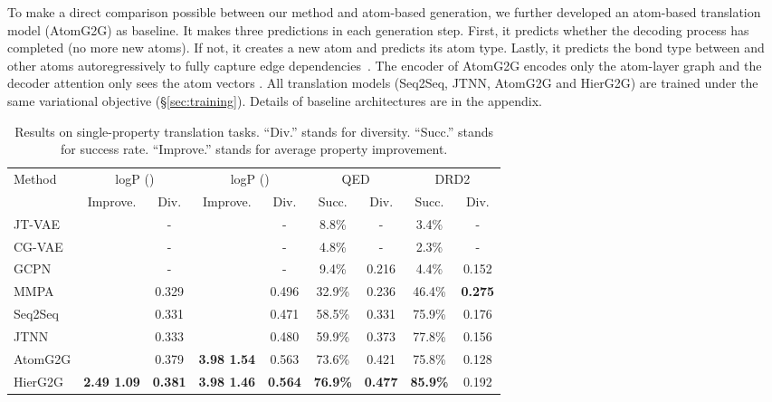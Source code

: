 \documentclass{article} \usepackage{iclr2020_conference,times}
\begin{document}
To make a direct comparison possible between our method and atom-based generation, we further developed an atom-based translation model (AtomG2G) as baseline. 
It makes three predictions in each generation step. First, it predicts whether the decoding process has completed (no more new atoms). If not, it creates a new atom  and predicts its atom type. Lastly, it predicts the bond type between  and other atoms autoregressively to fully capture edge dependencies~\citep{you2018graphrnn}.
The encoder of AtomG2G encodes only the atom-layer graph and the decoder attention only sees the atom vectors . All translation models (Seq2Seq, JTNN, AtomG2G and HierG2G) are trained under the same variational objective (\S\ref{sec:training}). Details of baseline architectures are in the appendix. 

\begin{table}[t]
\centering
\caption{Results on single-property translation tasks. ``Div.'' stands for diversity. ``Succ.'' stands for success rate. ``Improve.'' stands for average property improvement.}
\vspace{-4pt}
\begin{tabular}{lcccccccc}
\hline
\multirow{2}{*}{Method} & \multicolumn{2}{c}{ logP () } & \multicolumn{2}{c}{ logP () } & \multicolumn{2}{c}{ QED } & \multicolumn{2}{c}{ DRD2 } \Tstrut\Bstrut \\
\cline{2-9}
& Improve. & Div. & Improve. & Div. & Succ. & Div. & Succ. & Div. \Tstrut\Bstrut \\
\hline
JT-VAE &  & - &  & - & 8.8\% & - & 3.4\% & - \Tstrut\Bstrut \\
CG-VAE &  & - &  & - & 4.8\% & - & 2.3\% & - \Tstrut\Bstrut \\
GCPN &  & - &  & - & 9.4\% & 0.216 & 4.4\% & 0.152 \Tstrut\Bstrut \\
MMPA &  & 0.329 &  & 0.496 & 32.9\% & 0.236 & 46.4\% & \textbf{0.275} \Tstrut\Bstrut \\
Seq2Seq &  & 0.331 &  & 0.471 & 58.5\% & 0.331 & 75.9\% & 0.176 \Tstrut\Bstrut \\
JTNN &  & 0.333 &  & 0.480 & 59.9\% & 0.373 & 77.8\% & 0.156 \Tstrut\Bstrut \\
AtomG2G &  & 0.379 & \textbf{3.98  1.54} & 0.563 & 73.6\% & 0.421 & 75.8\% & 0.128 \Tstrut\Bstrut \\
\hline
HierG2G & \textbf{2.49  1.09} & \textbf{0.381} & \textbf{3.98  1.46} & \textbf{0.564} & \textbf{76.9\%} & \textbf{0.477} & \textbf{85.9\%} & 0.192 \Tstrut\Bstrut \\
\hline
\end{tabular}
\label{tab:prop1}
\vspace{-6pt}
\end{table}
\end{document}
